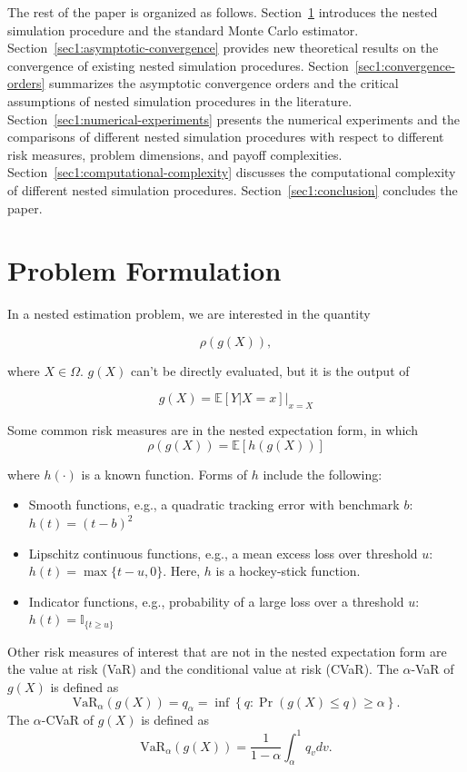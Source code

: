 The rest of the paper is organized as follows.
Section~\ref{sec1:problem-formulation} introduces the nested simulation procedure and the standard Monte Carlo estimator.
Section~\ref{sec1:asymptotic-convergence} provides new theoretical results on the convergence of existing nested simulation procedures.
Section~\ref{sec1:convergence-orders} summarizes the asymptotic convergence orders and the critical assumptions of nested simulation procedures in the literature.
Section~\ref{sec1:numerical-experiments} presents the numerical experiments and the comparisons of different nested simulation procedures with respect to different risk measures, problem dimensions, and payoff complexities.
Section~\ref{sec1:computational-complexity} discusses the computational complexity of different nested simulation procedures.
Section~\ref{sec1:conclusion} concludes the paper.

\section{Problem Formulation} \label{sec1:problem-formulation}

In a nested estimation problem, we are interested in the quantity 

$$\rho(g(X)), $$

where $X \in \Omega$. 
$g(X)$ can't be directly evaluated, but it is the output of 

$$ g(X) = \mathbb{E}\left[ Y|X=x \right]\vert_{x=X} $$

Some common risk measures are in the nested expectation form, in which 
$$\rho(g(X)) = \mathbb{E}\left[ h(g(X)) \right]$$

where $h(\cdot)$ is a known function. 
Forms of $h$ include the following:
\begin{itemize}
    \item 	Smooth functions, e.g., a quadratic tracking error with benchmark $b$: $h(t) = (t - b)^2$
    \item 	Lipschitz continuous functions, e.g., a mean excess loss over threshold $u$: $h(t) = \max\{t - u, 0\}$. Here, $h$ is a hockey-stick function.
    \item 	Indicator functions, e.g., probability of a large loss over a threshold $u$: $h(t) = \mathbb{I}_{\{t \geqslant u\}}$
\end{itemize}

Other risk measures of interest that are not in the nested expectation form are the value at risk (VaR) and the conditional value at risk (CVaR). 
The $\alpha$-VaR of $g(X)$ is defined as
$$
    \mbox{VaR}_\alpha(g(X)) = q_\alpha = \inf \left\{ q: \Pr(g(X)\leq q) \geq \alpha \right\}.
$$
The $\alpha$-CVaR of $g(X)$ is defined as
$$
    \mbox{VaR}_\alpha(g(X)) =\frac{1}{1-\alpha} \int_{\alpha}^{1} q_v dv. 
$$

